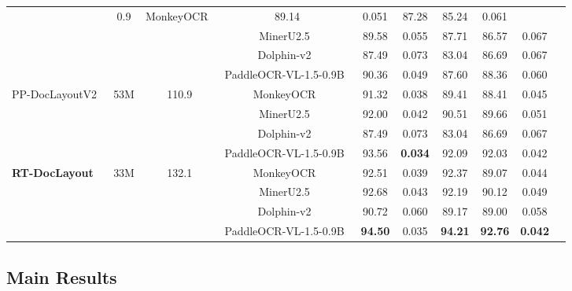 \documentclass[11pt, a4paper,logo,  copyright, nonumbering]{paddleocr}
\begin{document}
\begin{table}[t]
{\begin{tabular}{l|c|c|c|c|c c c c c}
& \multirow{4}{*}{0.9}
& MonkeyOCR~\cite{li2026monkeyocrdocumentparsingstructurerecognitionrelation} & 89.14 & 0.051 & 87.28 & 85.24 & 0.061 \\
& & & MinerU2.5~\cite{niu2025mineru25decoupledvisionlanguagemodel} & 89.58 & 0.055 & 87.71 & 86.57 & 0.067 \\
& & & Dolphin-v2~\cite{feng2026dolphinv2universaldocumentparsing} & 87.49 & 0.073 & 83.04 & 86.69 & 0.067 \\
& & & PaddleOCR-VL-1.5-0.9B~\cite{cui2026paddleocrvl15multitask09bvlm} & 90.36 & 0.049 & 87.60 & 88.36 & 0.060 \\
\midrule
\multirow{4}{*}{PP-DocLayoutV2~\cite{cui2025paddleocrvlboostingmultilingualdocument}}
& \multirow{4}{*}{53M}
& \multirow{4}{*}{110.9}
& MonkeyOCR~\cite{li2026monkeyocrdocumentparsingstructurerecognitionrelation} & 91.32 & 0.038 & 89.41 & 88.41 & 0.045 \\ \
& & & MinerU2.5~\cite{niu2025mineru25decoupledvisionlanguagemodel} & 92.00 & 0.042 & 90.51 & 89.66 & 0.051 \\
& & & Dolphin-v2~\cite{feng2026dolphinv2universaldocumentparsing} & 87.49 & 0.073 & 83.04 & 86.69 & 0.067 \\
& & & PaddleOCR-VL-1.5-0.9B~\cite{cui2026paddleocrvl15multitask09bvlm} & 93.56 & \textbf{0.034} & 92.09 & 92.03 & 0.042 \\
\midrule
 \multirow{4}{*}{\textbf{RT-DocLayout}}
& \multirow{4}{*}{33M}
& \multirow{4}{*}{132.1}
& MonkeyOCR~\cite{li2026monkeyocrdocumentparsingstructurerecognitionrelation} & 92.51 & 0.039 & 92.37 & 89.07 & 0.044 \\ 
& & & MinerU2.5~\cite{niu2025mineru25decoupledvisionlanguagemodel} & 92.68 & 0.043 & 92.19 & 90.12 & 0.049 \\
& & & Dolphin-v2~\cite{feng2026dolphinv2universaldocumentparsing} & 90.72 & 0.060 & 89.17 & 89.00 & 0.058 \\
& & & PaddleOCR-VL-1.5-0.9B~\cite{cui2026paddleocrvl15multitask09bvlm} & \textbf{94.50} & 0.035 & \textbf{94.21} & \textbf{92.76} & \textbf{0.042} \\
\bottomrule
\end{tabular}
}
\label{tab:layout_recognition_combo}
\end{table}

\subsection{Main Results}
\label{subsec:main_results}
\end{document}
